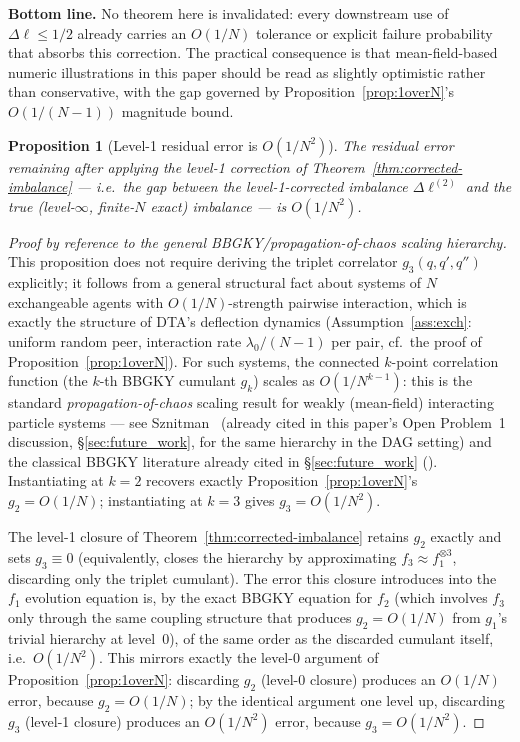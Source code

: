 \documentclass[11pt,a4paper]{article}
\newtheorem{proposition}[theorem]{Proposition}
\begin{document}
\noindent\textbf{Bottom line.} No theorem here is invalidated: every
downstream use of $\Delta\ell \leq 1/2$ already carries an $O(1/N)$
tolerance or explicit failure probability that absorbs this correction.
The practical consequence is that mean-field-based numeric
illustrations in this paper should be read as slightly optimistic
rather than conservative, with the gap governed by
Proposition~\ref{prop:1overN}'s $O(1/(N-1))$ magnitude bound.

\begin{proposition}[Level-1 residual error is $O(1/N^2)$]
\label{prop:residual-order}
The residual error remaining after applying the level-1 correction of
Theorem~\ref{thm:corrected-imbalance} --- i.e.\ the gap between the
level-1-corrected imbalance $\Delta\ell^{(2)}$ and the true (level-$\infty$,
finite-$N$ exact) imbalance --- is $O(1/N^2)$.
\end{proposition}

\begin{proof}[Proof by reference to the general BBGKY/propagation-of-chaos
scaling hierarchy]
This proposition does not require deriving the triplet correlator
$g_3(q,q',q'')$ explicitly; it follows from a general structural fact
about systems of $N$ exchangeable agents with $O(1/N)$-strength pairwise
interaction, which is exactly the structure of DTA's deflection dynamics
(Assumption~\ref{ass:exch}: uniform random peer, interaction rate
$\lambda_0/(N-1)$ per pair, cf.\ the proof of
Proposition~\ref{prop:1overN}). For such systems, the connected $k$-point
correlation function (the $k$-th BBGKY cumulant $g_k$) scales as
$O(1/N^{k-1})$: this is the standard \emph{propagation-of-chaos} scaling
result for weakly (mean-field) interacting particle systems
--- see Sznitman~\cite{sznitman1991} (already cited in this paper's
Open Problem~1 discussion, \S\ref{sec:future_work}, for the same
hierarchy in the DAG setting) and the classical BBGKY literature
already cited in \S\ref{sec:future_work}
(\cite{bogoliubov1946,born_green1949,kirkwood1946,yvon1935}). Instantiating
at $k=2$ recovers exactly Proposition~\ref{prop:1overN}'s
$g_2 = O(1/N)$; instantiating at $k=3$ gives $g_3 = O(1/N^2)$.

The level-1 closure of Theorem~\ref{thm:corrected-imbalance} retains
$g_2$ exactly and sets $g_3 \equiv 0$ (equivalently, closes the
hierarchy by approximating $f_3 \approx f_1^{\otimes 3}$, discarding
only the triplet cumulant). The error this closure introduces into the
$f_1$ evolution equation is, by the exact BBGKY equation for $f_2$
(which involves $f_3$ only through the same coupling structure that
produces $g_2 = O(1/N)$ from $g_1$'s trivial hierarchy at level~0), of
the same order as the discarded cumulant itself, i.e.\ $O(1/N^2)$. This
mirrors exactly the level-0 argument of
Proposition~\ref{prop:1overN}: discarding $g_2$ (level-0 closure)
produces an $O(1/N)$ error, because $g_2 = O(1/N)$; by the identical
argument one level up, discarding $g_3$ (level-1 closure) produces an
$O(1/N^2)$ error, because $g_3 = O(1/N^2)$.
\end{proof}
\end{document}
